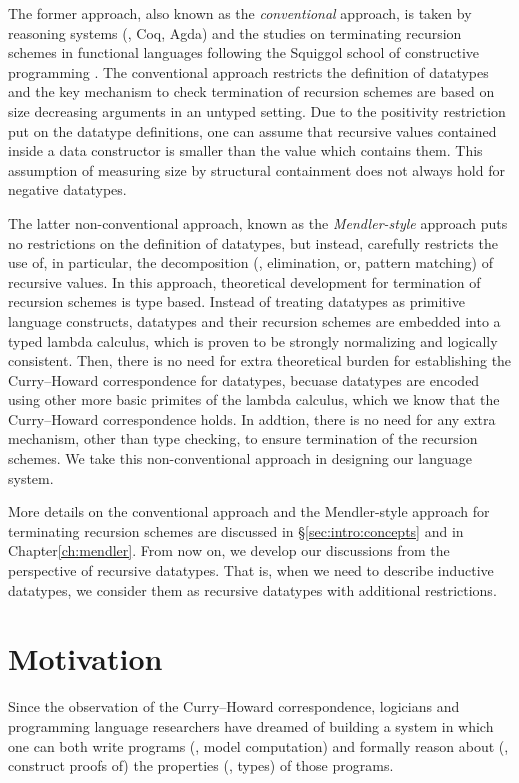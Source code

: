 The former approach, also known as the \emph{conventional} approach,
is taken by reasoning systems (\eg, Coq, Agda) and the studies on
terminating recursion schemes in functional languages following
the Squiggol school of constructive programming \cite{AoP,hagino87phd,Bir87}.
The conventional approach restricts the definition of datatypes and
the key mechanism to check termination of recursion schemes are based on
size decreasing arguments in an untyped setting. Due to the positivity
restriction put on the datatype definitions, one can assume that
recursive values contained inside a data constructor is smaller than
the value which contains them. This assumption of measuring size by
structural containment does not always hold for negative datatypes.

The latter non-conventional approach, known as the \emph{Mendler-style} approach
puts no restrictions on the definition of datatypes, but instead, carefully
restricts the use of, in particular, the decomposition (\ie, elimination, or,
pattern matching) of recursive values. In this approach, theoretical
development for termination of recursion schemes is type based.
Instead of treating datatypes as primitive language constructs, datatypes
and their recursion schemes are embedded into a typed lambda calculus,
which is proven to be strongly normalizing and logically consistent.
Then, there is no need for extra theoretical burden for establishing
the Curry--Howard correspondence for datatypes, becuase datatypes are
encoded using other more basic primites of the lambda calculus, which we
know that the Curry--Howard correspondence holds. In addtion, there is
no need for any extra mechanism, other than type checking, to ensure
termination of the recursion schemes. We take this non-conventional
approach in designing our language system.

More details on the conventional approach and the Mendler-style approach
for terminating recursion schemes are discussed in \S\ref{sec:intro:concepts}
and in Chapter\;\ref{ch:mendler}. From now on, we develop our discussions
from the perspective of recursive datatypes. That is, when we need to describe
inductive datatypes, we consider them as recursive datatypes with additional
restrictions.

\section{Motivation}\label{sec:intro:motiv}
Since the observation of the Curry--Howard correspondence, logicians and
programming language researchers have dreamed of building a system in which
one can both write programs (\ie, model computation) and formally reason about
(\ie, construct proofs of) the properties (\ie, types) of those programs.

